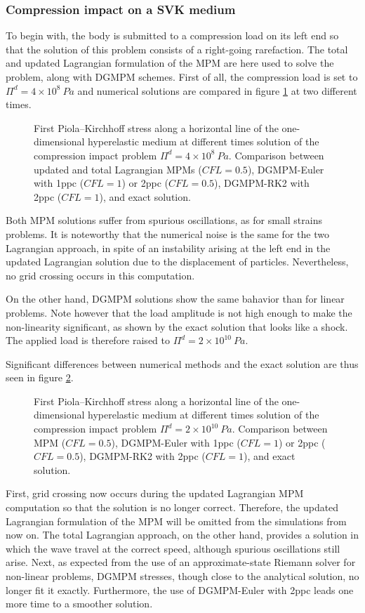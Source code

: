 \subsubsection{Compression impact on a SVK medium}
To begin with, the body is submitted to a compression load on its left end so that the solution of this problem consists of a right-going rarefaction. The total and updated Lagrangian formulation of the MPM are here used to solve the problem, along with DGMPM schemes. First of all, the compression load is set to $\Pi^d= 4\times 10^{8} \: Pa$ and numerical solutions are compared in figure \ref{fig:he_rarefaction_UL} at two different times.
\begin{figure}[h!]
  \centering
  {}
  \caption{First Piola–Kirchhoff stress along a horizontal line of the one-dimensional hyperelastic medium at different times solution of the compression impact problem $\Pi^d= 4\times 10^{8} \: Pa$. Comparison between updated and total Lagrangian MPMs ($CFL=0.5$), DGMPM-Euler with 1ppc ($CFL=1$) or 2ppc ($CFL=0.5$), DGMPM-RK2 with 2ppc ($CFL=1$), and exact solution.}
  \label{fig:he_rarefaction_UL}
\end{figure}
Both MPM solutions suffer from spurious oscillations, as for small strains problems. It is noteworthy that the numerical noise is the same for the two Lagrangian approach, in spite of an instability arising at the left end in the updated Lagrangian solution due to the displacement of particles. Nevertheless, no grid crossing occurs in this computation.

On the other hand, DGMPM solutions show the same bahavior than for linear problems. Note however that the load amplitude is not high enough to make the non-linearity significant, as shown by the exact solution that looks like a shock. The applied load is therefore raised to $\Pi^d= 2\times 10^{10} \: Pa$.

Significant differences between numerical methods and the exact solution are thus seen in figure \ref{fig:he_rarefaction}.
\begin{figure}[h!]
  \centering
  {}
  \caption{First Piola–Kirchhoff stress along a horizontal line of the one-dimensional hyperelastic medium at different times solution of the compression impact problem $\Pi^d= 2\times 10^{10} \: Pa$. Comparison between MPM ($CFL=0.5$), DGMPM-Euler with 1ppc ($CFL=1$) or 2ppc ($CFL=0.5$), DGMPM-RK2 with 2ppc ($CFL=1$), and exact solution.}
  \label{fig:he_rarefaction}
\end{figure}
First, grid crossing now occurs during the updated Lagrangian MPM computation so that the solution is no longer correct. Therefore, the updated Lagrangian formulation of the MPM will be omitted from the simulations from now on.
The total Lagrangian approach, on the other hand, provides a solution in which the wave travel at the correct speed, although spurious oscillations still arise.
Next, as expected from the use of an approximate-state Riemann solver for non-linear problems, DGMPM stresses, though close to the analytical solution, no longer fit it exactly.
Furthermore, the use of DGMPM-Euler with 2ppc leads one more time to a smoother solution.

